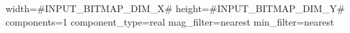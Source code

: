 width=#INPUT_BITMAP_DIM_X#
height=#INPUT_BITMAP_DIM_Y#
components=1
component_type=real
mag_filter=nearest
min_filter=nearest
